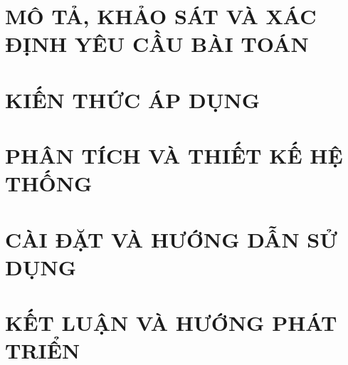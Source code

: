 \documentclass[a4paper,13pt,3p,twoside]{report}
\theoremstyle{definition}
\begin{document}
	\glsaddall 
	\renewcommand*{\glossaryname}{Danh sách thuật ngữ}
	\renewcommand*{\acronymname}{DANH MỤC THUẬT NGỮ VÀ TỪ VIẾT TẮT}
	\renewcommand*{\entryname}{Thuật ngữ}
	\renewcommand*{\descriptionname}{Ý nghĩa}
	\printnoidxglossaries
	
	
	
	
	\newpage
	
	\pagestyle{fancy}
	\fancyhf{}
	\fancyhead[RE, LO]{\leftmark}
	\fancyfoot[RE, LO]{\thepage}
	
	\chapter{MÔ TẢ, KHẢO SÁT VÀ XÁC ĐỊNH YÊU CẦU BÀI TOÁN}
	\label{chapter:Introduction}
	
	\newpage
	\chapter{KIẾN THỨC ÁP DỤNG}
	\label{chapter:Related_works}
	
	
	
	\newpage
	\chapter{PHÂN TÍCH VÀ THIẾT KẾ HỆ THỐNG}
	\label{chapter:Methodology}
	
	
	\newpage
	\chapter{CÀI ĐẶT VÀ HƯỚNG DẪN SỬ DỤNG}
	\label{chapter:Experiment}
	
	
	\newpage
	\chapter{KẾT LUẬN VÀ HƯỚNG PHÁT TRIỂN}
	\label{chapter:SolutionAndContribution}
	
	\newpage
% 
\end{document}
